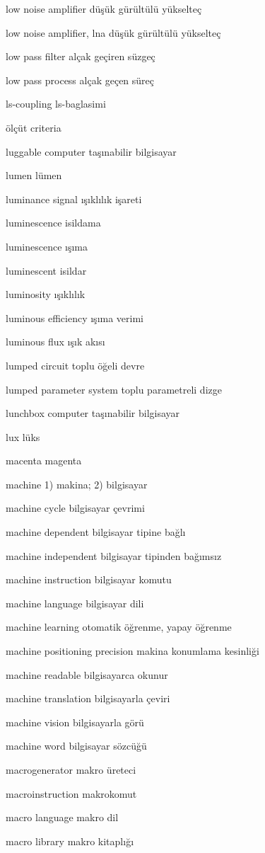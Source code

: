 \documentclass[12pt,fleqn]{article}\usepackage{../../common}
\begin{document}
low noise amplifier düşük gürültülü yükselteç

low noise amplifier, lna düşük gürültülü yükselteç

low pass filter alçak geçiren süzgeç

low pass process alçak geçen süreç

ls-coupling ls-baglasimi

ölçüt criteria

luggable computer taşınabilir bilgisayar

lumen lümen

luminance signal ışıklılık işareti

luminescence isildama

luminescence ışıma

luminescent isildar

luminosity ışıklılık

luminous efficiency ışıma verimi

luminous flux ışık akısı

lumped circuit toplu öğeli devre

lumped parameter system toplu parametreli dizge

lunchbox computer taşınabilir bilgisayar

lux lüks

macenta magenta

machine 1) makina; 2) bilgisayar

machine cycle bilgisayar çevrimi

machine dependent bilgisayar tipine bağlı

machine independent bilgisayar tipinden bağımsız

machine instruction bilgisayar komutu

machine language bilgisayar dili

machine learning otomatik öğrenme, yapay öğrenme

machine positioning precision makina konumlama kesinliği

machine readable bilgisayarca okunur

machine translation bilgisayarla çeviri

machine vision bilgisayarla görü

machine word bilgisayar sözcüğü

macrogenerator makro üreteci

macroinstruction makrokomut

macro language makro dil

macro library makro kitaplığı
\end{document}
